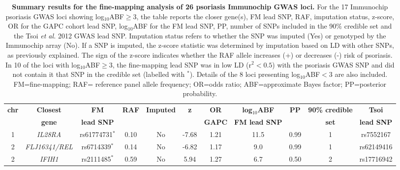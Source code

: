 \begin{landscape}
\renewcommand{\arraystretch}{0.7}
\begin{center}
\begin{longtable}[ht]{c c c c c c c c c c c}
\caption[Summary results for the fine-mapping analysis of 26 psoriasis Immunochip GWAS loci.]{\textbf{Summary results for the fine-mapping analysis of 26 psoriasis Immunochip GWAS loci.} For the 17 Immunochip psoriasis GWAS loci showing log${_10}$ABF$\geq$3, the table reports the closer gene(s), FM lead SNP, RAF, imputation status, z-score, OR for the GAPC cohort lead SNP, log$_{10}$ABF for the FM lead SNP, PP, number of SNPs included in the 90\% credible set and the Tsoi \textit{et al.} 2012 GWAS lead SNP. Imputation status refers to whether the SNP was imputed (Yes) or genotyped by the Immunochip array (No). If a SNP is imputed, the z-score statistic was determined by imputation based on LD with other SNPs, as previously explained. The sign of the z-score indicates whether the RAF allele increases (+) or decreases (-) risk of psoriasis. In 10 of the loci with log$_{10}$ABF$\geq$3, the fine-mapping lead SNP was in low LD (r${^2}<0.5$) with the psoriasis GWAS SNP and did not contain it that SNP in the credible set (labelled with $^{\ast}$). Details of the 8 loci presenting log${_10}$ABF$<3$ are also included. FM=fine-mapping; RAF= reference panel allele frequency; OR=odds ratio; ABF=approximate Bayes factor; PP=posterior probability.}
\label{tab:Psoriasis_fine_mapping_summary} \\
\toprule
\textbf{chr} & \textbf{Closest} & \textbf{FM} & \textbf{RAF} & \textbf{Imputed}& \textbf{z} &\textbf{OR} & \textbf{log$_{10}$ABF} & \textbf{PP} & \textbf{90\% credible} &\textbf{Tsoi} \\
              & \textbf{gene} & \textbf{lead SNP} &        &                  &           &\textbf{GAPC} & \textbf{FM lead SNP} &             & \textbf{set}           &\textbf{lead SNP} \\
\midrule
\midrule
1	& \textit{IL28RA}&	     rs61774731$^{\ast}$   &		0.10 &	No	& -7.68 &1.21 &		11.5 &		0.99 &		1	 &	rs7552167 \\
2	& \textit{FLJ16341/REL}& rs6714339$^{\ast}$    &		0.14 &	No	& -6.82 &1.17 &		9.0  &		0.99 &		1	 &	rs62149416 \\
2	& \textit{IFIH1}&		     rs2111485$^{\ast}$    &		0.59 &	No	& 5.94  &1.27 &		6.7  &		0.50 &		2	 &	rs17716942 \\

\end{longtable}
\end{center}
\end{landscape}
